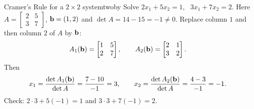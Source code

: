 \documentclass[11pt]{article}
\begin{document}
\begin{exmp}{Cramer's Rule for a $2\times2$ system}{twoby}
Solve $2x_1+5x_2=1$, \ $3x_1+7x_2=2$. Here $A=\begin{bmatrix}2&5\\3&7\end{bmatrix}$, $\mathbf{b}=(1,2)$ and $\det A=14-15=-1\neq0$. Replace column $1$ and then column $2$ of $A$ by $\mathbf{b}$:
\[
A_1(\mathbf{b})=\begin{bmatrix}1&5\\2&7\end{bmatrix},\qquad A_2(\mathbf{b})=\begin{bmatrix}2&1\\3&2\end{bmatrix}.
\]
Then
\[
x_1=\frac{\det A_1(\mathbf{b})}{\det A}=\frac{7-10}{-1}=3,\qquad x_2=\frac{\det A_2(\mathbf{b})}{\det A}=\frac{4-3}{-1}=-1.
\]
Check: $2\cdot3+5(-1)=1$ and $3\cdot3+7(-1)=2$.
\end{exmp}
\end{document}
